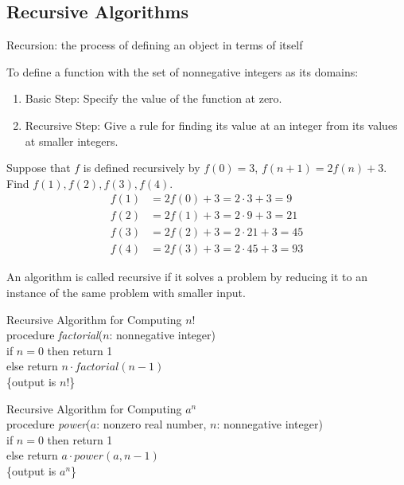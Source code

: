 \documentclass[12pt]{article}
\begin{document}
\subsection{Recursive Algorithms} 
\begin{definition} Recursion: the process of defining an object in terms of itself \end{definition} 
To define a function with the set of nonnegative integers as its domains: \begin{enumerate} 
\item Basic Step: Specify the value of the function at zero. 
\item Recursive Step: Give a rule for finding its value at an integer from its values at smaller integers. \end{enumerate} 
\begin{example} Suppose that $f$ is defined recursively by $f(0) = 3$, $f(n + 1) = 2f(n) + 3$. Find $f(1), f(2), f(3), f(4)$. $$\begin{aligned} f(1) &= 2f(0) + 3 = 2 \cdot 3 + 3 = 9 \\ f(2) &= 2f(1) + 3 = 2 \cdot 9 + 3 = 21 \\ f(3) &= 2f(2) + 3 = 2 \cdot 21 + 3 = 45 \\ f(4) &= 2f(3) + 3 = 2 \cdot 45 + 3 = 93 \end{aligned} $$ \end{example} 
\begin{definition} An algorithm is called recursive if it solves a problem by reducing it to an instance of the same problem with smaller input. \end{definition} 
\begin{alg} Recursive Algorithm for Computing $n!$ \\ 
procedure \textit{factorial}($n$: nonnegative integer) \\ 
if $n = 0$ then return 1 \\ else return $n \cdot factorial(n - 1)$ \\ \{output is $n!$\} \end{alg} 
\begin{alg} Recursive Algorithm for Computing $a^n$ \\ 
procedure \textit{power}($a$: nonzero real number, $n$: nonnegative integer) \\ 
if $n = 0$ then return 1 \\
else return $a \cdot power(a, n - 1)$ \\ \{output is $a^n$\} \end{alg} 
\end{document}
